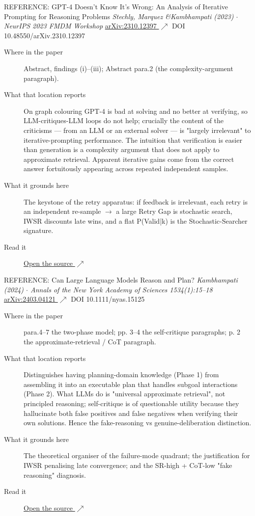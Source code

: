 \begin{bmmcard}{REFERENCE: GPT-4 Doesn't Know It's Wrong: An Analysis of Iterative Prompting for Reasoning Problems}
\emph{Stechly, Marquez \&Kambhampati (2023) \(\cdot\) NeurIPS 2023 FMDM Workshop}
\href{https://arxiv.org/abs/2310.12397}{arXiv:2310.12397 \(\nearrow\)} DOI 10.48550/arXiv.2310.12397
\begin{description}
\item[Where in the paper] Abstract, findings (i)--(iii); Abstract para.2 (the complexity-argument paragraph).
\item[What that location reports] On graph colouring GPT-4 is bad at solving and no better at verifying, so LLM-critiques-LLM loops do not help; crucially the content of the criticisms --- from an LLM or an external solver --- is "largely irrelevant" to iterative-prompting performance. The intuition that verification is easier than generation is a complexity argument that does not apply to approximate retrieval. Apparent iterative gains come from the correct answer fortuitously appearing across repeated independent samples.
\item[What it grounds here] The keystone of the retry apparatus: if feedback is irrelevant, each retry is an independent re-sample \(\rightarrow\) a large Retry Gap is stochastic search, IWSR discounts late wins, and a flat P(Valid|k) is the Stochastic-Searcher signature.
\item[Read it] \href{https://arxiv.org/abs/2310.12397}{Open the source \(\nearrow\)}
\end{description}
\end{bmmcard}

\begin{bmmcard}{REFERENCE: Can Large Language Models Reason and Plan?}
\emph{Kambhampati (2024) \(\cdot\) Annals of the New York Academy of Sciences 1534(1):15--18}
\href{https://arxiv.org/abs/2403.04121}{arXiv:2403.04121 \(\nearrow\)} DOI 10.1111/nyas.15125
\begin{description}
\item[Where in the paper] para.4--7 the two-phase model; pp. 3--4 the self-critique paragraphs; p. 2 the approximate-retrieval / CoT paragraph.
\item[What that location reports] Distinguishes having planning-domain knowledge (Phase 1) from assembling it into an executable plan that handles subgoal interactions (Phase 2). What LLMs do is "universal approximate retrieval", not principled reasoning; self-critique is of questionable utility because they hallucinate both false positives and false negatives when verifying their own solutions. Hence the fake-reasoning vs genuine-deliberation distinction.
\item[What it grounds here] The theoretical organiser of the failure-mode quadrant; the justification for IWSR penalising late convergence; and the SR-high + CoT-low "fake reasoning" diagnosis.
\item[Read it] \href{https://arxiv.org/abs/2403.04121}{Open the source \(\nearrow\)}
\end{description}
\end{bmmcard}

